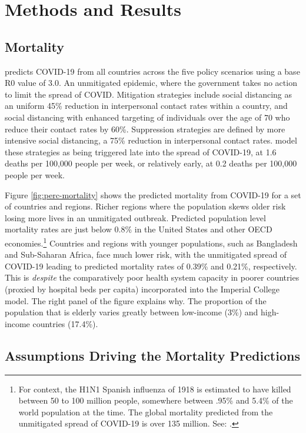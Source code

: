 \documentclass[11pt]{article}
\begin{document}
\section{Methods and Results}

\subsection{Mortality}

\textcite{walker2020} predicts COVID-19 from all countries across the five policy scenarios using a base R0 value of 3.0. An unmitigated epidemic, where the government takes no action to limit the spread of COVID. Mitigation strategies include social distancing as an uniform 45\% reduction in interpersonal contact rates within a country, and social distancing with enhanced targeting of individuals over the age of 70 who reduce their contact rates by 60\%. Suppression strategies are defined by more intensive social distancing, a 75\% reduction in interpersonal contact rates. \textcite{walker2020} model these strategies as being triggered late into the spread of COVID-19, at 1.6 deaths per 100,000 people per week, or relatively early, at 0.2 deaths per 100,000 people per week.
 
Figure \ref{fig:perc-mortality} shows the predicted mortality from COVID-19 for a set of countries and regions. Richer regions where the population skews older risk losing more lives in an unmitigated outbreak. Predicted population level mortality rates are just below 0.8\% in the United States and other OECD economies.\footnote{
    For context, the H1N1 Spanish influenza of 1918 is estimated to have killed between 50 to 100 million people, somewhere between .95\% and 5.4\% of the world population at the time. The global mortality predicted from the unmitigated spread of COVID-19 is over 135 million. See: \textcite{taubenberger2006,johnson2002}.}
Countries and regions with younger populations, such as Bangladesh and Sub-Saharan Africa, face much lower risk, with the unmitigated spread of COVID-19 leading to predicted mortality rates of 0.39\% and 0.21\%, respectively. This is \emph{despite} the comparatively poor health system capacity in poorer countries (proxied by hospital beds per capita) incorporated into the Imperial College model. The right panel of the figure explains why. The proportion of the population that is elderly varies greatly between low-income (3\%) and high-income countries (17.4\%).


\subsection{Assumptions Driving the Mortality Predictions}
\end{document}
